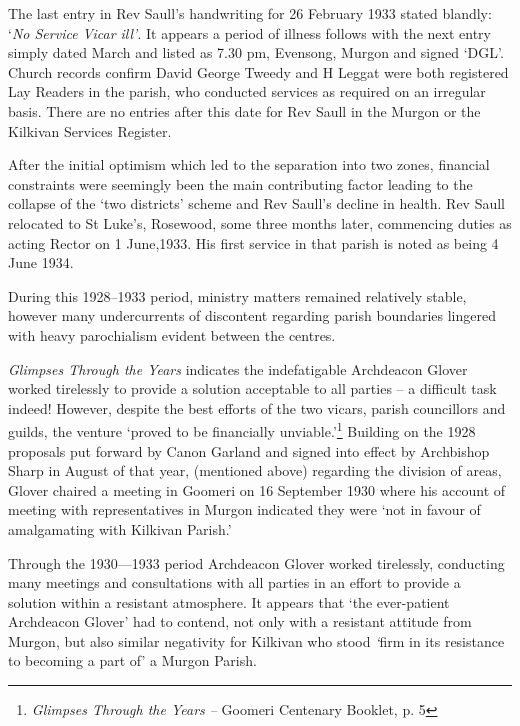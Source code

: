 The last entry in Rev Saull's handwriting for 26 February 1933 stated blandly: `\emph{No Service Vicar ill'}. It appears a period of illness follows with the next entry simply dated March and listed as 7.30 pm, Evensong, Murgon and signed `DGL'. Church records confirm David George Tweedy and H Leggat were both registered Lay Readers in the parish, who conducted services as required on an irregular basis. There are no entries after this date for Rev Saull in the Murgon or the Kilkivan Services Register.



After the initial optimism which led to the separation into two zones, financial constraints were seemingly been the main contributing factor leading to the collapse of the `two districts' scheme and Rev Saull's decline in health. Rev Saull relocated to St Luke's, Rosewood, some three months later, commencing duties as acting Rector on 1 June,1933. His first service in that parish is noted as being 4 June 1934.



During this 1928--1933 period, ministry matters remained relatively stable, however many undercurrents of discontent regarding parish boundaries lingered with heavy parochialism evident between the centres.



\emph{Glimpses Through the Years} indicates the indefatigable Archdeacon Glover worked tirelessly to provide a solution acceptable to all parties -- a difficult task indeed! However, despite the best efforts of the two vicars, parish councillors and guilds, the venture `proved to be financially unviable.'\footnote{\emph{Glimpses Through the Years --} Goomeri Centenary Booklet, p. 5} Building on the 1928 proposals put forward by Canon Garland and signed into effect by Archbishop Sharp in August of that year, (mentioned above) regarding the division of areas, Glover chaired a meeting in Goomeri on 16 September 1930 where his account of meeting with representatives in Murgon indicated they were `not in favour of amalgamating with Kilkivan Parish.'


Through the 1930---1933 period Archdeacon Glover worked tirelessly, conducting many meetings and consultations with all parties in an effort to provide a solution within a resistant atmosphere. It appears that `the ever-patient Archdeacon Glover' had to contend, not only with a resistant attitude from Murgon, but also similar negativity for Kilkivan who stood \emph{`}firm in its resistance to becoming a part of' a Murgon Parish.



